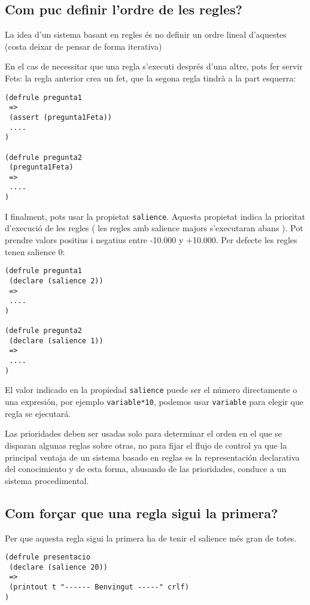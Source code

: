 \documentclass[11pt,svgnames]{scrbook}
\begin{document}
\subsection{Com puc definir l'ordre de les regles?}

La idea d'un sistema basant en regles és no definir un ordre lineal d'aquestes
(costa deixar de pensar de forma iterativa)

En el cas de necessitar que una regla s'executi després d'una altre, pots fer
servir Fets: la regla anterior crea un fet, que la segona regla tindrà a la part
esquerra:

\begin{verbatim}
(defrule pregunta1
 =>
 (assert (pregunta1Feta))
 ....
)

(defrule pregunta2
 (pregunta1Feta)
 =>
 ....
)
\end{verbatim} 

I finalment, pots usar la propietat \texttt{salience}. Aquesta propietat indica
la prioritat d'execució de les regles ( les regles amb salience majors
s'executaran abans ). Pot prendre valors positius i negatius entre -10.000 y
+10.000. Per defecte les
regles tenen salience 0:

\begin{verbatim}
(defrule pregunta1
 (declare (salience 2))
 =>
 ....
)

(defrule pregunta2
 (declare (salience 1))
 =>
 ....
)
\end{verbatim} 

El valor indicado en la propiedad \texttt{salience} puede ser el número
directamente o una expresión, por ejemplo \texttt{variable*10},
podemos usar \texttt{variable} para elegir que regla se ejecutará. 

Las prioridades deben ser usadas solo para determinar el orden en el que se
disparan algunas reglas sobre otras, no para fijar el flujo de control ya que la
principal ventaja de un sistema basado en reglas es la representación
declarativa del conocimiento y de esta forma, abusando de las prioridades,
conduce a un sistema procedimental.




\subsection{Com forçar que una regla sigui la primera?}

Per que aquesta regla sigui la primera ha de tenir el salience més gran de
totes.

\begin{verbatim}
(defrule presentacio
 (declare (salience 20))
 =>
 (printout t "------ Benvingut -----" crlf)
)
\end{verbatim} 
\end{document}
